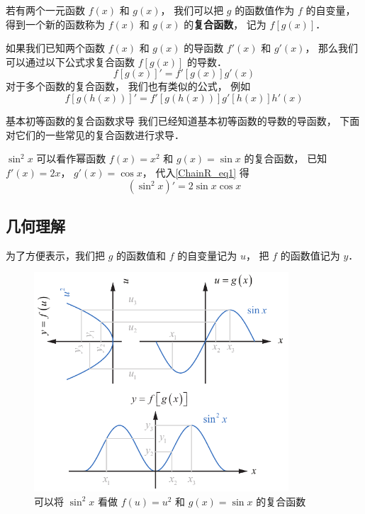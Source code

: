 
若有两个一元函数 $f(x)$ 和 $g(x)$， 我们可以把 $g$ 的函数值作为 $f$ 的自变量， 得到一个新的函数称为 $f(x)$ 和 $g(x)$ 的\textbf{复合函数}， 记为 $f[g(x)]$．

如果我们已知两个函数 $f(x)$ 和 $g(x)$ 的导函数 $f'(x)$ 和 $g'(x)$， 那么我们可以通过以下公式求复合函数 $f[g(x)]$ 的导数．
\begin{equation}\label{ChainR_eq1}
f[g(x)]' = f'[g(x)]g'(x)
\end{equation}
对于多个函数的复合函数， 我们也有类似的公式， 例如
\begin{equation}
f[g(h(x))]' = f'[g(h(x))]g'[h(x)]h'(x)
\end{equation}

\begin{example}{基本初等函数的复合函数求导}
我们已经知道基本初等函数的导数的导函数， 下面对它们的一些常见的复合函数进行求导．

$\sin^2 x$ 可以看作幂函数 $f(x) = x^2$ 和 $g(x) = \sin x$ 的复合函数， 已知 $f'(x) = 2x$， $g'(x) = \cos x$， 代入\autoref{ChainR_eq1} 得
\begin{equation}
(\sin^2 x)' = 2\sin x \cos x
\end{equation}

\end{example}

\subsection{几何理解}
为了方便表示，我们把 $g$ 的函数值和 $f$ 的自变量记为 $u$， 把 $f$ 的函数值记为 $y$．

\begin{figure}[ht]
\centering
\includegraphics[width=9.5cm]{./figures/ChainR_1.pdf}
\caption{可以将 $\sin^2 x$ 看做 $f(u) = u^2$ 和 $g(x) = \sin x$ 的复合函数}\label{ChainR_fig1}
\end{figure}

